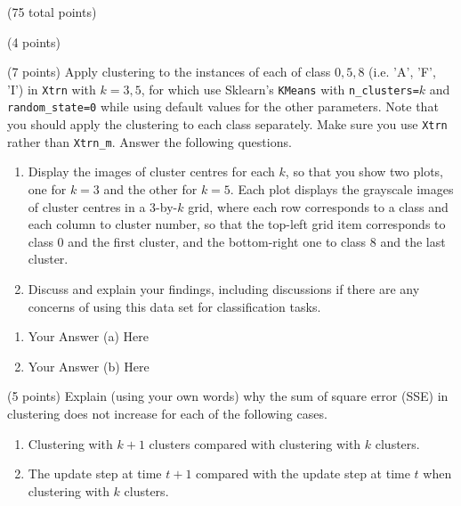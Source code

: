 \documentclass[12pt]{article}
\begin{document}
\begin{question}{(75 total points) \qTwoTitle}
\begin{subquestion}{(4 points)
  }
\end{subquestion}

\begin{subquestion}{(7 points)
    Apply \kmeans clustering to the instances of each of class $0,5,8$ (i.e. 'A', 'F', 'I') in {\tt Xtrn} with $k = 3,5$, for which use Sklearn's {\tt KMeans} with {\tt n\_clusters=}$k$ and {\tt random\_state=0} while using default values for the other parameters. Note that you should apply the clustering to each class separately. Make sure you use {\tt Xtrn} rather than {\tt Xtrn\_m}.
    Answer the following questions.
  }
  \begin{enumerate}\NARROWITEM
  \item Display the images of cluster centres for each $k$, so that you show two plots, one for $k=3$  and the other for $k=5$. Each plot displays the grayscale images of cluster centres in a 3-by-$k$ grid, where each row corresponds to a class and each column to cluster number, so that the top-left grid item corresponds to class 0 and the first cluster, and the bottom-right one to class 8 and the last cluster.
  \item Discuss and explain your findings, including discussions if there are any concerns of using this data set for classification tasks.
  \end{enumerate}
   

  \begin{answerbox}{0.75\textheight}
    \begin{enumerate}
    \item Your Answer (a) Here
    \item Your Answer (b) Here
    \end{enumerate}
  \end{answerbox}
  


\end{subquestion}

\begin{subquestion}{(5 points)
    Explain (using your own words) why the sum of square error (SSE) in \kmeans clustering does not increase for each of the following cases.
  }
  \begin{enumerate}\NARROWITEM
  \item Clustering with $k+1$ clusters compared with clustering with $k$ clusters.
  \item The update step at time $t+1$ compared with the update step at time $t$ when clustering with $k$ clusters.
  \end{enumerate}
   


\end{subquestion}
\end{question}
\end{document}
